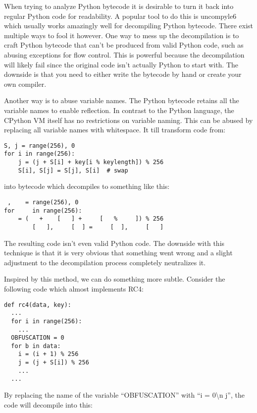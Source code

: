 \documentclass[twocolumn]{article}
\begin{document}
\vspace*{-0.3\baselineskip}


When trying to analyze Python bytecode it is desirable to turn it back into regular Python code for readability. A popular tool to do this is uncompyle6 which usually works amazingly well for decompiling Python bytecode. There exist multiple ways to fool it however. One way to mess up the decompilation is to craft Python bytecode that can't be produced from valid Python code, such as abusing exceptions for flow control. This is powerful because the decompilation will likely fail since the original code isn't actually Python to start with. The downside is that you need to either write the bytecode by hand or create your own compiler.

Another way is to abuse variable names. The Python bytecode retains all the variable names to enable reflection. In contrast to the Python language, the CPython VM itself has no restrictions on variable naming. This can be abused by replacing all variable names with whitespace. It till transform code from:

\begin{verbatim}
S, j = range(256), 0
for i in range(256):
    j = (j + S[i] + key[i % keylength]) % 256
    S[i], S[j] = S[j], S[i]  # swap
\end{verbatim}

into bytecode which decompiles to something like this:

\begin{verbatim}
 ,    = range(256), 0
for     in range(256):
    = (   +    [   ] +     [   %     ]) % 256
        [   ],     [  ] =     [  ],     [   ]
\end{verbatim}

The resulting code isn't even valid Python code. The downside with this technique is that it is very obvious that something went wrong and a slight adjustment to the decompilation process completely neutralizes it. 

Inspired by this method, we can do something more subtle. Consider the following code which almost implements RC4:

\begin{verbatim}
def rc4(data, key):
  ...
  for i in range(256):
    ...
  OBFUSCATION = 0
  for b in data:
    i = (i + 1) % 256
    j = (j + S[i]) % 256
    ...
  ...
\end{verbatim}

By replacing the name of the variable ``OBFUSCATION'' with ``i = 0\textbackslash n  j'', the code will decompile into this:
\end{document}

